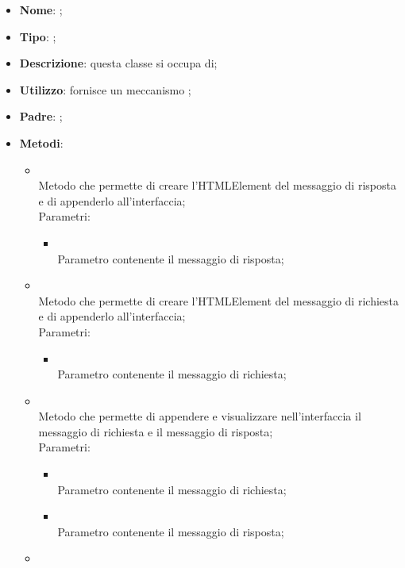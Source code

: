 \begin{itemize}
	\item \textbf{Nome}: ;
	\item \textbf{Tipo}: ;
	\item \textbf{Descrizione}: questa classe si occupa di;
	\item \textbf{Utilizzo}: fornisce un meccanismo ;
	\item \textbf{Padre}: ;
	\item \textbf{Metodi}:
	\begin{itemize}
		\item[]  \\
		Metodo che permette di creare l'HTMLElement del messaggio di risposta e di appenderlo all'interfaccia;\\
		Parametri:
		\begin{itemize}
			\item {} \\
			Parametro contenente il messaggio di risposta;
		\end{itemize}
		\item[]  \\
		Metodo che permette di creare l'HTMLElement del messaggio di richiesta e di appenderlo all'interfaccia;\\
		Parametri:
		\begin{itemize}
			\item {} \\
			Parametro contenente il messaggio di richiesta;
		\end{itemize}
		\item[]  \\
		Metodo che permette di appendere e visualizzare nell'interfaccia il messaggio di richiesta e il messaggio di risposta;\\
		Parametri:
		\begin{itemize}
			\item {} \\
			Parametro contenente il messaggio di richiesta;
			\item {} \\
			Parametro contenente il messaggio di risposta;
		\end{itemize}
		\item[]  \\

\end{itemize}
\end{itemize}
